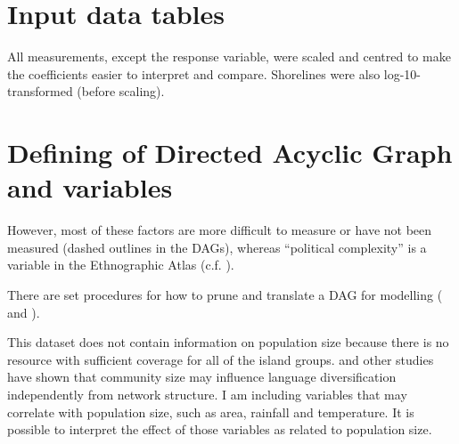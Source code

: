 \documentclass[unnumsec,webpdf,modern,medium]{oup-authoring-template}
\begin{document}
\begin{appendices}
\begin{landscape}

\end{landscape}


\FloatBarrier

\section{Input data tables}
\singlespacing
\label{appendix_data tables}
All measurements, except the response variable, were scaled and centred to make the coefficients easier to interpret and compare. Shorelines were also log-10-transformed (before scaling). 






\section{Defining of Directed Acyclic Graph and variables}
\label{appendix_DAG_def}

However, most of these factors are more difficult to measure or have not been measured (dashed outlines in the DAGs), whereas ``political complexity'' is a variable in the Ethnographic Atlas (c.f. \citet{gray1998ethnographic}).

 There are set procedures for how to prune and translate a DAG for modelling (\citet{pearl1995causal} and \citet{mcelreath2020statistical}). 

This dataset does not contain information on population size because there is no resource with sufficient coverage for all of the island groups. \citet{raviv2019larger} and other studies have shown that community size may influence language diversification independently from network structure. I am including variables that may correlate with population size, such as area, rainfall and temperature. It is possible to interpret the effect of those variables as related to population size.




\end{appendices}
\end{document}
